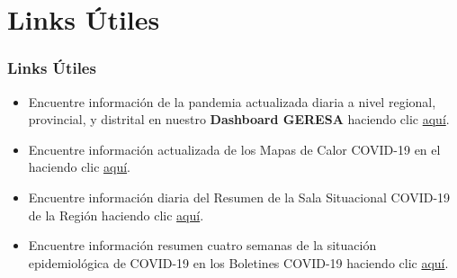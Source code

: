 \documentclass[xcolor=table]{beamer}
\begin{document}
\section{Links Útiles}

\begin{frame}[label=links]
	\frametitle{Links Útiles}
	\vspace{-.5cm}
	\begin{itemize}
		\item Encuentre {\color{mycolor4} información de la pandemia actualizada diaria a nivel regional, provincial, y distrital} en nuestro {\color{mycolor4}\textbf{Dashboard GERESA}} haciendo clic \href{https://geresacusco.shinyapps.io/DASHBOARD_COVID-19_CUSCO/}{\color{mycolor2}aquí}.
		\item Encuentre información actualizada de los {\color{mycolor4}Mapas de Calor COVID-19} en el haciendo clic \href{http://www.diresacusco.gob.pe/diresa/}{\color{mycolor2}aquí}.
		\item Encuentre información diaria del {\color{mycolor4} Resumen de la Sala Situacional COVID-19} de la Región haciendo clic \href{https://app.powerbi.com/view?r=eyJrIjoiZDdiMzA4YWMtZTZmNC00ZWE2LWFmMmYtODkwZmM1ODhiYTljIiwidCI6IjM2NGE0NmEwLTk0YzctNGZkNi1iYTNjLTlmMmQzMjA5YzFlZiJ9}{\color{mycolor2}aquí}.
		\item Encuentre información resumen cuatro semanas de la situación epidemiológica de COVID-19 en los {\color{mycolor4}Boletines COVID-19} haciendo clic \href{https://sites.google.com/view/geresacusco/boletines-epidemiologicos-covid-19}{\color{mycolor2}aquí}. \hyperlink{indice}{}
	\end{itemize}

\end{frame}




\end{document}
